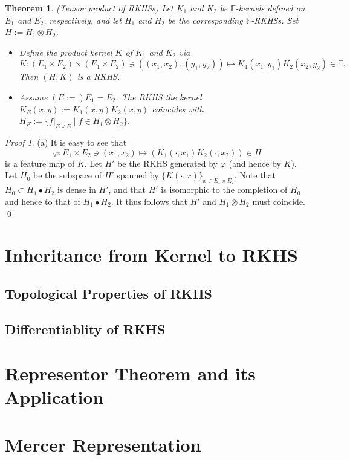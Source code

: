 \documentclass[a4paper,12pt]{article}
\newtheorem{thm}{Theorem}[section]
\theoremstyle{remark}
\newtheorem*{prf}{Proof}
\theoremstyle{definition}
\theoremstyle{definition}
\theoremstyle{definition}
\begin{document}
\begin{thm} (Tensor product of RKHSs)
	Let \( K_1 \) and \( K_2 \) be \( \mathbb{F} \)-kernels defined on \( E_1 \) and \( E_2 \), respectively, and let \( H_1 \) and \( H_2 \) be the corresponding \( \mathbb{F} \)-RKHSs. Set \( H:=H_1 \otimes H_2 \).
	\begin{itemize}
		\item[(a)] Define the product kernel \( K \) of \( K_1 \) and \( K_2 \) via
		      \begin{equation*}
			      K:(E_1 \times E_2) \times (E_1 \times E_2) \ni \left( (x_1, x_2), (y_1,y_2) \right) \mapsto K_1(x_1,y_1)K_2(x_2,y_2) \in \mathbb{F}.
		      \end{equation*}
		      Then \( (H,K) \) is a RKHS.
		\item[(b)] Assume \( (E:=) E_1 = E_2 \). The RKHS the kernel \( K_E(x,y) :=K_1(x,y)K_2(x,y) \) coincides with \( H_E:=\{f|_{E \times E} \mid f \in H_1 \otimes H_2\} \).
	\end{itemize}
\end{thm}
\begin{prf}
	(a) It is easy to see that
	\begin{equation*}
		\varphi:E_1 \times E_2 \ni (x_1,x_2) \mapsto \left( K_1(\cdot ,x_1)K_2(\cdot ,x_2) \right)\in H
	\end{equation*}
	is a feature map of \( K \). Let \( H' \) be the RKHS generated by \( \varphi \) (and hence by \( K \)). Let \( H_0 \) be the subspace of \( H' \) spanned by \( \{K(\cdot ,x)\}_{x \in E_1 \times E_2} \).
	Note that \( H_0 \subset H_1 \bullet H_2\) is dense in \( H' \), and that \( H' \) is isomorphic to the completion of \( H_0 \) and hence to that of \( H_1 \bullet H_2 \). It thus follows that \( H' \) and \( H_1 \otimes H_2 \) must coincide.
	\qed\end{prf}

\section{Inheritance from Kernel to RKHS}
\subsection{Topological Properties of RKHS}
\subsection{Differentiablity of RKHS}

\section{Representor Theorem and its Application}

\section{Mercer Representation}


\end{document}
